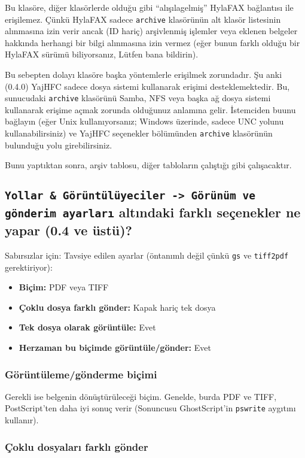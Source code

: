 \documentclass[a4paper,10pt]{scrartcl}
\begin{document}
Bu klasöre, diğer klasörlerde olduğu gibi "`alışılagelmiş"' HylaFAX bağlantısı ile erişilemez. Çünkü HylaFAX sadece 
\texttt{archive} klasörünün alt klasör listesinin alınmasına izin verir ancak (ID hariç) arşivlenmiş işlemler veya eklenen belgeler hakkında herhangi bir bilgi alınmasına izin vermez (eğer bunun farklı olduğu bir HylaFAX sürümü biliyorsanız, Lütfen bana bildirin).

Bu sebepten dolayı klasöre başka yöntemlerle erişilmek zorundadır. Şu anki (0.4.0) YajHFC sadece dosya sistemi kullanarak erişimi desteklemektedir. Bu, sunucudaki \texttt{archive} klasörünü Samba, NFS veya başka ağ dosya sistemi kullanarak erişime açmak zorunda olduğunuz anlamına gelir. İstemciden buunu bağlayın (eğer Unix kullanıyorsanız; Windows üzerinde, sadece UNC yolunu kullanabilirsiniz) ve YajHFC seçenekler bölümünden \texttt{archive} klasörünün bulunduğu yolu girebilirsiniz.

Bunu yaptıktan sonra, arşiv tablosu, diğer tabloların çalıştığı gibi çalışacaktır.

\subsection{\texttt{Yollar \& Görüntülüyeciler -> Görünüm ve gönderim ayarları} altındaki farklı seçenekler ne yapar (0.4 ve üstü)?}

Sabırsızlar için: Tavsiye edilen ayarlar (öntanımlı değil çünkü \texttt{gs} ve \texttt{tiff2pdf} gerektiriyor):
\begin{itemize}
 \item \textbf{Biçim:} PDF veya TIFF
 \item \textbf{Çoklu dosya farklı gönder:} Kapak hariç tek dosya
 \item \textbf{Tek dosya olarak görüntüle:} Evet
 \item \textbf{Herzaman bu biçimde görüntüle/gönder:} Evet
\end{itemize}

\subsubsection{Görüntüleme/gönderme biçimi}

Gerekli ise belgenin dönüştürüleceği biçim. Genelde, burda PDF ve TIFF, PostScript'ten daha iyi sonuç verir (Sonuncusu GhostScript'in \texttt{pswrite} aygıtını kullanır).

\subsubsection{Çoklu dosyaları farklı gönder}
\end{document}
